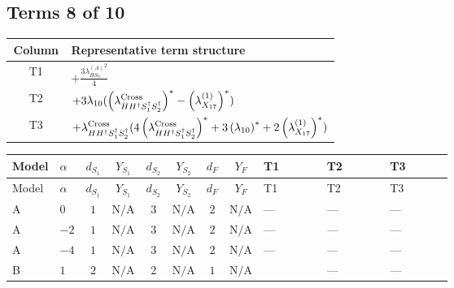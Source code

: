 \documentclass[8pt]{article}
\begin{document}
\begin{landscape}
\subsection*{Terms 8 of 10}
\begin{center}
\begin{tabular}{@{}c >{\raggedright\arraybackslash}p{0.82\linewidth}@{}}
\toprule
Column & Representative term structure \\
\midrule
T1 & \(\displaystyle +\frac{3 {\lambda_{HS_2}^{(A)}}^2}{4}\) \\
\midrule
T2 & \(\displaystyle +3 {\lambda_{10}} (\left({\lambda_{H H^\dagger S_1^\dagger S_2^\dagger}^{\rm Cross}}\right)^{*}-\left({\lambda_{X_{17}}^{(1)}}\right)^{*})\) \\
\midrule
T3 & \(\displaystyle +{\lambda_{H H^\dagger S_1^\dagger S_2^\dagger}^{\rm Cross}} (4 \left({\lambda_{H H^\dagger S_1^\dagger S_2^\dagger}^{\rm Cross}}\right)^{*}+3 \left({\lambda_{10}}\right)^{*}+2 \left({\lambda_{X_{17}}^{(1)}}\right)^{*})\) \\
\midrule
\bottomrule
\end{tabular}
\end{center}
\smallskip
\tiny
\begin{longtable}{@{}llcccccc >{\raggedright\arraybackslash}p{0.21\linewidth} >{\raggedright\arraybackslash}p{0.21\linewidth} >{\raggedright\arraybackslash}p{0.21\linewidth}@{}}
\toprule
Model & $\alpha$ & $d_{S_1}$ & $Y_{S_1}$ & $d_{S_2}$ & $Y_{S_2}$ & $d_F$ & $Y_F$ & T1 & T2 & T3 \\
\midrule
\endfirsthead
\toprule
Model & $\alpha$ & $d_{S_1}$ & $Y_{S_1}$ & $d_{S_2}$ & $Y_{S_2}$ & $d_F$ & $Y_F$ & T1 & T2 & T3 \\
\midrule
\endhead
A & $0$ & $1$ & $\text{N/A}$ & $3$ & $\text{N/A}$ & $2$ & $\text{N/A}$ & --- & --- & --- \\
\midrule
A & $-2$ & $1$ & $\text{N/A}$ & $3$ & $\text{N/A}$ & $2$ & $\text{N/A}$ & --- & --- & --- \\
\midrule
A & $-4$ & $1$ & $\text{N/A}$ & $3$ & $\text{N/A}$ & $2$ & $\text{N/A}$ & --- & --- & --- \\
\midrule
B & $1$ & $2$ & $\text{N/A}$ & $2$ & $\text{N/A}$ & $1$ & $\text{N/A}$ & \scriptsize\adjustbox{max width=\linewidth}{$\begin{gathered} +\frac{3 {\lambda_{HS_2}^{(A)}}^2}{4}\end{gathered}$} & --- & --- \\
\midrule

\end{longtable}
\end{landscape}
\end{document}
